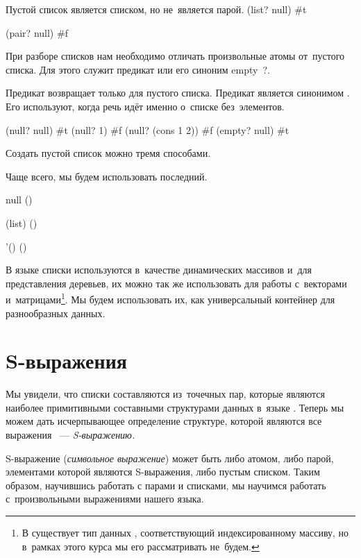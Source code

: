 \begin{example}{%
Пустой список является списком, но не~является парой.} 
\REPL
  {(list? null)}
  {#t} 

\REPL
  {(pair? null)}
  {#f}
\end{example}

При разборе списков нам необходимо отличать произвольные атомы от~пустого списка. Для этого служит предикат  или его синоним \si{empty?}.

\begin{example}{%
Предикат  возвращает   только для пустого списка.
Предикат  является синонимом . Его используют, когда речь идёт именно о~списке без~элементов.}

\REPL
  {(null? null)}
  {#t}
\REPL
  {(null? 1)}
  {#f}
\REPL
  {(null? (cons 1 2))}
  {#f}
\REPL
  {(empty? null)}
  {#t}
\end{example}

\vspace{-\medskipamount}
\begin{example}{Создать пустой список можно тремя способами.

Чаще всего, мы будем использовать последний.}
\REPL
  {null}
  {()}

\REPL
  {(list)}
  {()}

\REPL
  {'()}
  {()}
\end{example}

В языке \Scheme списки используются в~качестве динамических массивов и~для представления деревьев, их можно так же использовать для работы с~векторами и~матрицами\footnote{В \Scheme существует тип данных , соответствующий индексированному массиву, но в~рамках этого курса мы его рассматривать не~будем.}. Мы будем использовать их, как универсальный контейнер для разнообразных данных.

\section[2]{S-выражения}%
\label{Sec:S-expr}%
Мы увидели, что списки составляются из~точечных пар, которые являются наиболее примитивными составными структурами данных в~языке \Scheme. Теперь мы можем дать исчерпывающее определение структуре, которой являются все выражения \Scheme~--- \emph{S-выражению.}

S-выражение (\emph{символьное выражение}) может быть либо атомом, либо парой, элементами которой являются S-выражения, либо пустым списком. Таким образом, научившись работать с парами и списками, мы научимся работать с~произвольными выражениями нашего языка.


